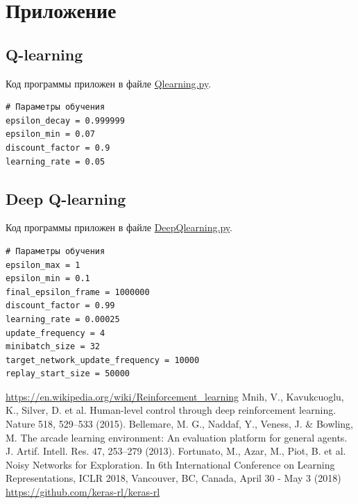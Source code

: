 \documentclass{letask}
\begin{document}
\newpage
{}
\section*{Приложение}
\subsection*{Q-learning}
Код программы приложен в файле \href{run:./Qlearning.py}{Qlearning.py}.
\begin{verbatim}
# Параметры обучения
epsilon_decay = 0.999999
epsilon_min = 0.07
discount_factor = 0.9
learning_rate = 0.05
\end{verbatim}

\subsection*{Deep Q-learning}
Код программы приложен в файле \href{run:./DeepQlearning.py}{DeepQlearning.py}.
\begin{verbatim}
# Параметры обучения
epsilon_max = 1
epsilon_min = 0.1
final_epsilon_frame = 1000000
discount_factor = 0.99
learning_rate = 0.00025
update_frequency = 4
minibatch_size = 32
target_network_update_frequency = 10000
replay_start_size = 50000
\end{verbatim}

\newpage

\begin{thebibliography}{}
     \url{https://en.wikipedia.org/wiki/Reinforcement_learning}
     Mnih, V., Kavukcuoglu, K., Silver, D. et al. Human-level control through deep reinforcement learning. Nature 518, 529–533 (2015).
     Bellemare, M. G., Naddaf, Y., Veness, J. \& Bowling, M. The arcade learning environment: An evaluation platform for general agents. J. Artif. Intell. Res. 47, 253–279 (2013).
     Fortunato, M., Azar, M., Piot, B. et al. Noisy Networks for Exploration. In 6th International Conference on Learning Representations, ICLR 2018, Vancouver, BC, Canada, April 30 - May 3 (2018)
     \url{https://github.com/keras-rl/keras-rl}
\end{thebibliography}
\end{document}
